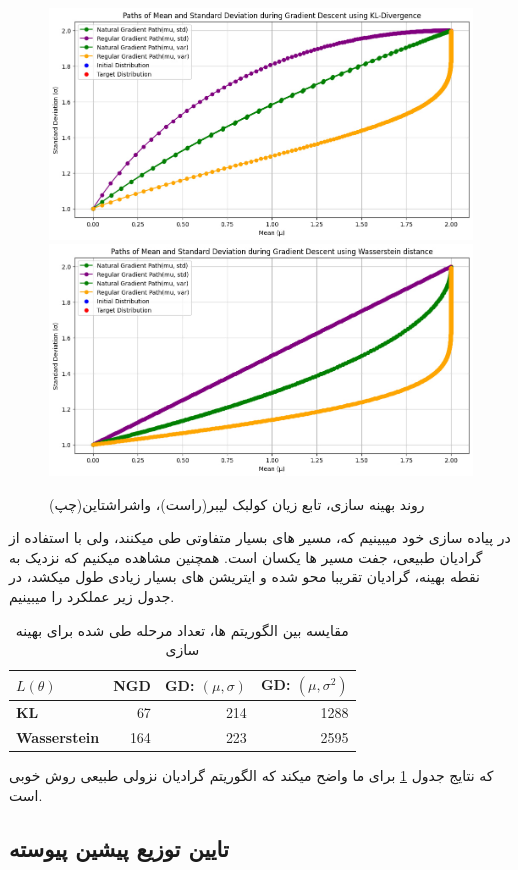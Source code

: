 \begin{figure}[h]
	\centering
	\includegraphics*[width=0.49\linewidth]{Pictures/Q6/NG-KL.jpg}
	\includegraphics*[width=0.49\linewidth]{Pictures/Q6/NG-Wasserstein.jpg}
	\caption{روند بهینه سازی، تابع زیان کولبک لیبر(راست)، واشراشتاین(چپ)}
\end{figure}

در پیاده سازی خود میبینیم که، مسیر های بسیار متفاوتی طی میکنند، ولی با استفاده از گرادیان طبیعی، جفت مسیر ها یکسان است. همچنین مشاهده میکنیم که نزدیک به نقطه بهینه، گرادیان تقریبا محو شده و ایتریشن های بسیار زیادی طول میکشد، در جدول زیر عملکرد را میبینیم.

\begin{table}[h]
	\centering
	\begin{latin}
		\begin{tabular}{lrrr}
			\hline
			$L(\theta)$          & \textbf{NGD} & \textbf{GD: $(\mu, \sigma)$} & \textbf{GD: $(\mu, \sigma^2)$} \\
			\hline
			\textbf{KL}          & 67           & 214                        & 1288                         \\
			\textbf{Wasserstein} & 164          & 223                        & 2595                         \\
			\hline
		\end{tabular}
	\end{latin}
	\caption{مقایسه بین الگوریتم ها، تعداد مرحله طی شده برای بهینه سازی}
	\label{tab:distances}
\end{table}

که نتایج جدول \ref*{tab:distances} برای ما واضح میکند که الگوریتم گرادیان نزولی طبیعی روش خوبی است.

\subsection{تایین توزیع پیشین پیوسته}

